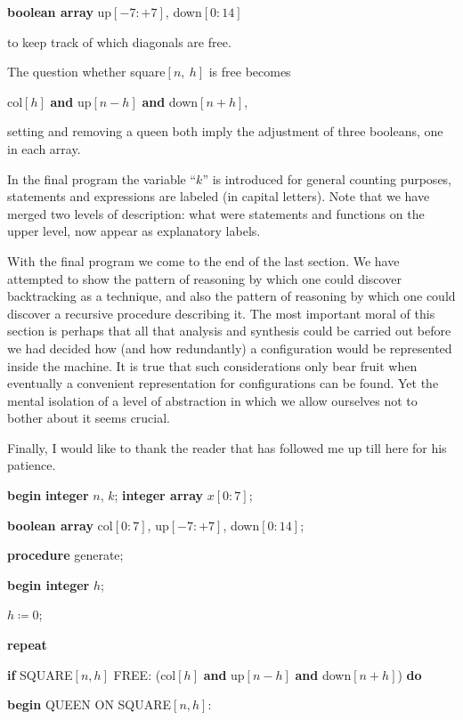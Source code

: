 \documentclass[twoside,11pt]{book}
\begin{document}
\quad \textbf{boolean array} up$[-7:+7]$, down$[0:14]$

\noindent
to keep track of which diagonals are free.

The question whether square$[n,\ h]$ is free becomes

\quad col$[h]$ \textbf{and} up$[n-h]$ \textbf{and} down$[n+h]$,

\noindent
setting and removing a queen both imply the adjustment of three booleans, one in each array.

In the final program the variable ``$k$'' is introduced for general counting purposes, statements and expressions are labeled (in capital letters). Note that we have merged two levels of description: what were statements and functions on the upper level, now appear as explanatory labels.

With the final program we come to the end of the last section. We have attempted to show the pattern of reasoning by which one could discover backtracking as a technique, and also the pattern of reasoning by which one could discover a recursive procedure describing it. The most important moral of this section is perhaps that all that analysis and synthesis could be carried out before we had decided how (and how redundantly) a configuration would be represented inside the machine. It is true that such considerations only bear fruit when eventually a convenient representation for configurations can be found. Yet the mental isolation of a level of abstraction in which we allow ourselves not to bother about it seems crucial.

Finally, I would like to thank the reader that has followed me up till here for his patience.
\bigskip

\noindent
\textbf{begin} \textbf{integer} $n$, $k$; \textbf{integer array} $x[0:7]$;

\noindent
\quad \quad \textbf{boolean array} col$[0:7]$, up$[-7:+7]$, down$[0:14]$;

\noindent
\quad \textbf{procedure} generate;

\noindent
\quad \textbf{begin integer} $h$;

\noindent
\quad \quad $h \coloneq 0$;

\noindent
\quad \quad \textbf{repeat}

\noindent
\quad \quad \quad \textbf{if} SQUARE$[n,h]$ FREE: (col$[h]$ \textbf{and} up$[n-h]$ \textbf{and} down$[n+h]$) \textbf{do}

\noindent
\quad \quad \quad \textbf{begin} QUEEN ON SQUARE$[n,h]$:
\end{document}

